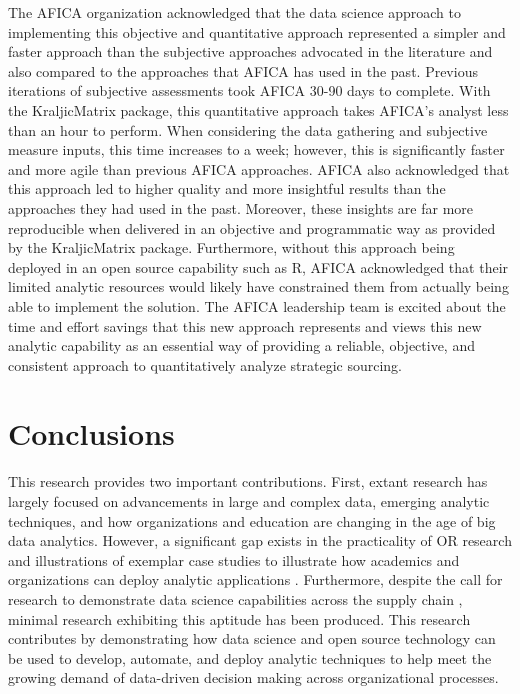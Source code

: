 \documentclass[twocolumn]{svjour3}       %
\begin{document}
The AFICA organization acknowledged that the data science approach to implementing this objective and quantitative approach represented a simpler and faster approach than the subjective approaches advocated in the literature and also compared to the approaches that AFICA has used in the past.  Previous iterations of subjective assessments took AFICA 30-90 days to complete.  With the KraljicMatrix package, this quantitative approach takes AFICA's analyst less than an hour to perform. When considering the data gathering and subjective measure inputs, this time increases to a week; however, this is significantly faster and more agile than previous AFICA approaches. AFICA also acknowledged that this approach led to higher quality and more insightful results than the approaches they had used in the past.  Moreover, these insights are far more reproducible when delivered in an objective and programmatic way as provided by the KraljicMatrix package.  Furthermore, without this approach being deployed in an open source capability such as R, AFICA acknowledged that their limited analytic resources would likely have constrained them from actually being able to implement the solution.  The AFICA leadership team is excited about the time and effort savings that this new approach represents and views this new analytic capability as an essential way of providing a reliable, objective, and consistent approach to quantitatively analyze strategic sourcing.


\section{Conclusions}

This research provides two important contributions. First, extant research has largely focused on advancements in large and complex data, emerging analytic techniques, and how organizations and education are changing in the age of big data analytics.  However, a significant gap exists in the practicality of OR research \citep{hsbh16} and illustrations of exemplar case studies to illustrate how academics and organizations can deploy analytic applications \citep{gh14,p14,wgnp16}.  Furthermore, despite the call for research to demonstrate data science capabilities across the supply chain \citep{wf13}, minimal research exhibiting this aptitude has been produced.  This research contributes by demonstrating how data science and open source technology can be used to develop, automate, and deploy analytic techniques to help meet the growing demand of data-driven decision making across organizational processes.
\end{document}
